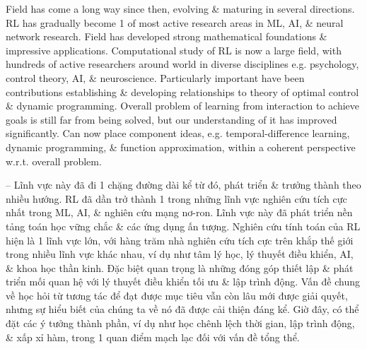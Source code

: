\documentclass{article}
\begin{document}
\begin{itemize}
    Field has come a long way since then, evolving \& maturing in several directions. RL has gradually become 1 of most active research areas in ML, AI, \& neural network research. Field has developed strong mathematical foundations \& impressive applications. Computational study of RL is now a large field, with hundreds of active researchers around world in diverse disciplines e.g. psychology, control theory, AI, \& neuroscience. Particularly important have been contributions establishing \& developing relationships to theory of optimal control \& dynamic programming. Overall problem of learning from interaction to achieve goals is still far from being solved, but our understanding of it has improved significantly. Can now place component ideas, e.g. temporal-difference learning, dynamic programming, \& function approximation, within a coherent perspective w.r.t. overall problem.

    -- Lĩnh vực này đã đi 1 chặng đường dài kể từ đó, phát triển \& trưởng thành theo nhiều hướng. RL đã dần trở thành 1 trong những lĩnh vực nghiên cứu tích cực nhất trong ML, AI, \& nghiên cứu mạng nơ-ron. Lĩnh vực này đã phát triển nền tảng toán học vững chắc \& các ứng dụng ấn tượng. Nghiên cứu tính toán của RL hiện là 1 lĩnh vực lớn, với hàng trăm nhà nghiên cứu tích cực trên khắp thế giới trong nhiều lĩnh vực khác nhau, ví dụ như tâm lý học, lý thuyết điều khiển, AI, \& khoa học thần kinh. Đặc biệt quan trọng là những đóng góp thiết lập \& phát triển mối quan hệ với lý thuyết điều khiển tối ưu \& lập trình động. Vấn đề chung về học hỏi từ tương tác để đạt được mục tiêu vẫn còn lâu mới được giải quyết, nhưng sự hiểu biết của chúng ta về nó đã được cải thiện đáng kể. Giờ đây, có thể đặt các ý tưởng thành phần, ví dụ như học chênh lệch thời gian, lập trình động, \& xấp xỉ hàm, trong 1 quan điểm mạch lạc đối với vấn đề tổng thể.


\end{itemize}
\end{document}
